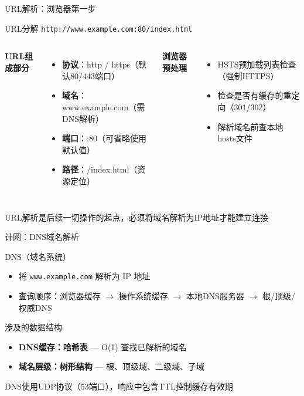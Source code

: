 \documentclass[10pt, aspectratio=169]{beamer}
\begin{document}
\begin{frame}{URL解析：浏览器第一步}
    \begin{block}{URL分解}
        \texttt{http://www.example.com:80/index.html}
    \end{block}
    \vspace{0.3em}
    \begin{columns}[T]
        \textbf{URL组成部分}
        \begin{itemize}
            \item \textbf{协议}：http / https（默认80/443端口）
            \item \textbf{域名}：www.example.com（需DNS解析）
            \item \textbf{端口}：:80（可省略使用默认值）
            \item \textbf{路径}：/index.html（资源定位）
        \end{itemize}
        \textbf{浏览器预处理}
        \begin{itemize}
            \item HSTS预加载列表检查（强制HTTPS）
            \item 检查是否有缓存的重定向（301/302）
            \item 解析域名前查本地hosts文件
        \end{itemize}
    \end{columns}
    \vspace{0.3em}
    \alert{URL解析是后续一切操作的起点，必须将域名解析为IP地址才能建立连接}
\end{frame}

\begin{frame}{计网：DNS域名解析}
    \begin{block}{DNS（域名系统）}
        \begin{itemize}
            \item 将 \texttt{www.example.com} 解析为 IP 地址
            \item 查询顺序：浏览器缓存 $\to$ 操作系统缓存 $\to$ 本地DNS服务器 $\to$ 根/顶级/权威DNS
        \end{itemize}
    \end{block}
    \begin{block}{涉及的数据结构}
        \begin{itemize}
            \item \textbf{DNS缓存：哈希表} --- O(1) 查找已解析的域名
            \item \textbf{域名层级：树形结构} --- 根、顶级域、二级域、子域
        \end{itemize}
    \end{block}
    \vspace{0.3em}
    \alert{DNS使用UDP协议（53端口），响应中包含TTL控制缓存有效期}
\end{frame}
\end{document}

